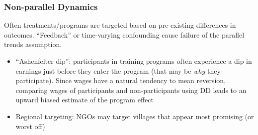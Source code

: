 \documentclass[xcolor=svgnames,9pt,english, aspectratio=169]{beamer}
\begin{document}
\begin{frame}
  \frametitle{Non-parallel Dynamics}
Often treatments/programs are targeted based on pre-existing differences in outcomes.  ``Feedback'' or time-varying confounding cause failure of the parallel trends assumption.\bigskip\pause
\begin{itemize}[<+->]\itemsep0.5em
   \item ``Ashenfelter dip'': participants in training programs often experience a dip in earnings
just before they enter the program (that may be \emph{why} they participate). Since wages have a natural tendency to mean reversion, comparing wages of participants and non-participants using DD leads to an upward biased estimate of the program effect
   \item Regional targeting: NGOs may target villages that appear most promising (or worst off)
\end{itemize}
\end{frame}
\end{document}
